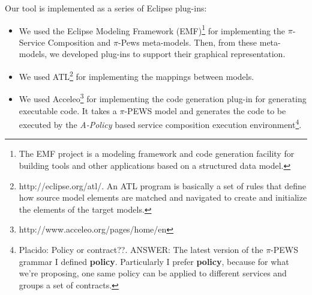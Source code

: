 Our tool is implemented as a series of Eclipse plug-ins: 
\begin{itemize}
\item 	We  used the Eclipse Modeling Framework (EMF)\footnote {The EMF project is a modeling framework and code generation facility for building tools and other applications based on a structured data model.}   for implementing the  $\pi$-Service Composition and $\pi$-{\sc Pews}  meta-models. 
Then, from these meta-models, we  developed plug-ins to support their graphical representation.

\item	 We used  ATL\footnote{http://eclipse.org/atl/. An ATL program is basically a set of rules that define how source model elements are matched and navigated to create and initialize the elements of the target models.}
for implementing the  mappings between models.

\item 	We  used Acceleo\footnote{http://www.acceleo.org/pages/home/en} for implementing  the code generation plug-in for generating executable code. 
It takes a $\pi$-PEWS model and generates the code to be executed by the {\em
A-Policy} based service composition execution environment\footnote{\color{red}
Placido: Policy or contract??. \color{blue} ANSWER: The latest version of the
$\pi$-PEWS grammar I defined \textbf{policy}. Particularly I prefer \textbf{policy},
because for what we're proposing, one same policy can be applied to different
services and groups a set of contracts.}.
\end{itemize}


